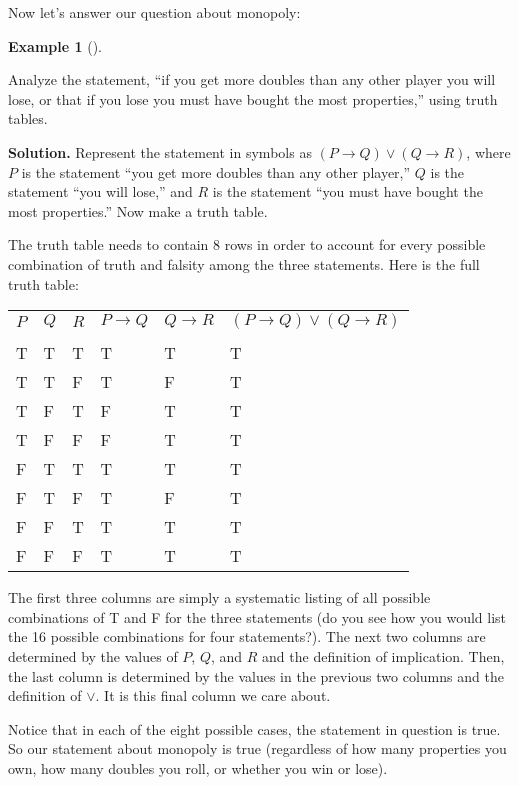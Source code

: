 \documentclass[10pt,]{book}
\theoremstyle{plain}
\theoremstyle{definition}
\newtheorem{example}[theorem]{Example}
\theoremstyle{definition}
\theoremstyle{definition}
\numberwithin{equation}{chapter}
\newcommand{\hrulethin}  {\noalign{\hrule height 0.04em}}
\def\imp{\rightarrow}
\begin{document}
          Now let's answer our question about monopoly:
\begin{example}[]\label{example-84}

              Analyze the statement, ``if you get more doubles than any other player you will lose, or that if you lose you must have bought the most properties,'' using truth tables.
\par\medskip\noindent%
\textbf{Solution.}\quad
              Represent the statement in symbols as \((P \imp Q) \vee (Q \imp R)\), where \(P\) is the statement ``you get more doubles than any other player,'' \(Q\) is the statement ``you will lose,'' and \(R\) is the statement ``you must have bought the most properties.'' Now make a truth table.
\par

              The truth table needs to contain 8 rows in order to account for every possible combination of truth and falsity among the three statements. Here is the full truth table:
\begin{tabular}{llllll}
\(P\)&\(Q\)&\(R\)&\(P \imp Q\)&\(Q \imp R\)&\((P \imp Q) \vee (Q \imp R)\)\tabularnewline[0pt]
&&&&&\tabularnewline\hrulethin
T&T&T&T&T&T\tabularnewline[0pt]
T&T&F&T&F&T\tabularnewline[0pt]
T&F&T&F&T&T\tabularnewline[0pt]
T&F&F&F&T&T\tabularnewline[0pt]
F&T&T&T&T&T\tabularnewline[0pt]
F&T&F&T&F&T\tabularnewline[0pt]
F&F&T&T&T&T\tabularnewline[0pt]
F&F&F&T&T&T
\end{tabular}
\par

              The first three columns are simply a systematic listing of all possible combinations of T and F for the three statements (do you see how you would list the 16 possible combinations for four statements?). The next two columns are determined by the values of \(P\), \(Q\), and \(R\) and the definition of implication. Then, the last column is determined by the values in the previous two columns and the definition of \(\vee\). It is this final column we care about.
\par

              Notice that in each of the eight possible cases, the statement in question is true. So our statement about monopoly is true (regardless of how many properties you own, how many doubles you roll, or whether you win or lose).
\end{example}
\par
\end{document}
